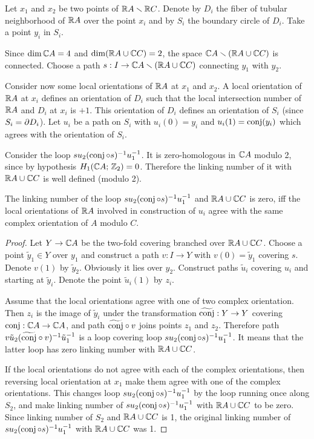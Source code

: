 \documentclass{article}
\numberwithin{equation}{section}
\begin{document}
Let $x_1$ and $x_2$ be two points of $\mathbb R A\smallsetminus\mathbb R C$.
Denote by $D_i$ the fiber of tubular neighborhood of $\mathbb R A$ over the
point $x_i$ and by $S_i$ the boundary circle of $D_i$. Take a point
$y_i$ in $S_i$.

Since $\dim\mathbb C A=4$ and $\dim(\mathbb R A\cup\mathbb C C)=2$, the space
$\mathbb C A\smallsetminus(\mathbb R A\cup\mathbb C C)$ is connected. Choose a path
$s:I\to\mathbb C A\smallsetminus(\mathbb R A\cup\mathbb C C)$ connecting $y_1$ with $y_2$.

Consider now some local orientations of $\mathbb R A$ at $x_1$ and $x_2$. A
local orientation of $\mathbb R A$ at $x_i$ defines an orientation of $D_i$
such that the local intersection number of $\mathbb R A$ and $D_i$ at $x_i$ is
$+1$.  This orientation of $D_i$ defines an orientation of $S_i$ (since
$S_i=\partial D_i$). Let $u_i$ be a path on $S_i$ with $u_i(0)=y_i$ and
$u_i(1)=\operatorname{conj}(y_i)$ which agrees with the orientation of $S_i$.

Consider the loop $s u_2 (\operatorname{conj}\circ s)^{-1}u_1^{-1}$. It is
zero-homologous in $\mathbb C A$ modulo 2, since by hypothesis
$H_1(\mathbb C A;\,\mathbb Z_2)=0$. Therefore the linking number of it with $\mathbb R A\cup\mathbb C
C$ is well defined (modulo 2).

\begin{lem}\label{3.4.A} The linking number of the loop $s u_2
(\operatorname{conj}\circ s)^{-1}u_1^{-1}$ and $\mathbb R A\cup\mathbb C C$ is zero, iff
the local orientations of $\mathbb R A$ involved in construction of
$u_i$ agree with the same complex orientation of $A$ modulo
$C$.\end{lem}

\begin{proof} Let $Y\to \mathbb C A$ be the two-fold covering branched over
$\mathbb R A\cup\mathbb C C$. Choose a point $\tilde y_1\in Y$ over $y_1$ and
construct a path $v:I\to Y$ with $v(0)=\tilde y_1$ covering $s$. Denote
$v(1)$ by $\tilde y_2$.  Obviously it lies over $y_2$. Construct paths
$\tilde u_i$ covering $u_i$ and starting at $\tilde y_i$. Denote the
point $\tilde u_i(1)$ by $z_i$.

Assume that the local orientations agree with one of two complex
orientation. Then $z_i$ is the image of $\tilde y_i$ under the
transformation $\widetilde{\operatorname{conj}}:Y\to Y$ covering $\operatorname{conj}:\mathbb C A\to\mathbb C A$,
and  path $\widetilde{\operatorname{conj}}\circ v$ joins points $z_1$ and $z_2$.
Therefore path $v\tilde u_2(\widetilde{\operatorname{conj}}\circ v)^{-1}\tilde u_1^{-1}$
is a loop covering loop  $su_2(\operatorname{conj}\circ s)^{-1}u_1^{-1}$.  It means
that the latter loop has zero linking number with $\mathbb R A\cup\mathbb C C$.

If the local orientations do not agree with each of the complex
orientations, then reversing local orientation at $x_1$ make them agree
with one of the complex orientations. This changes loop
$su_2(\operatorname{conj}\circ s)^{-1}u_1^{-1}$ by the loop running once along $S_2$,
and make linking number of $su_2(\operatorname{conj}\circ s)^{-1}u_1^{-1}$ with
$\mathbb R A\cup\mathbb C C$ to be zero. Since linking number of $S_2$ and $\mathbb R A\cup\mathbb C
C$ is 1, the original linking number of $su_2(\operatorname{conj}\circ
s)^{-1}u_1^{-1}$ with $\mathbb R A\cup\mathbb C C$ was 1.
\end{proof}
\end{document}
